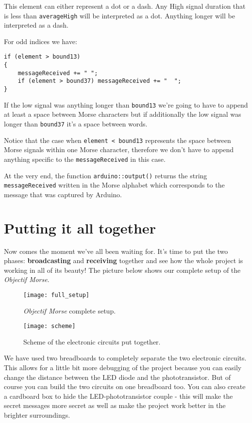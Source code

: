 \documentclass[12pt]{report}
\begin{document}
This element can either represent a dot or a dash. Any High signal duration that is less than \texttt{averageHigh} will be interpreted as a dot. Anything longer will be interpreted as a dash.

\newpage

For odd indices we have:

\begin{lstlisting}
if (element > bound13)
{
	messageReceived += " ";
	if (element > bound37) messageReceived += "  ";
}
\end{lstlisting}

If the low signal was anything longer than \texttt{bound13} we're going to have to append at least a space between Morse characters but if additionally the low signal was longer than \texttt{bound37} it's a space between words.

Notice that the case when \texttt{element < bound13} represents the space between Morse signals within one Morse character, therefore we don't have to append anything specific to the \texttt{messageReceived} in this case.

At the very end, the function \texttt{arduino::output()} returns the string \texttt{messageReceived} written in the Morse alphabet which corresponds to the message that was captured by Arduino.

\chapter{Putting it all together}

Now comes the moment we've all been waiting for. It's time to put the two phases: \textbf{broadcasting} and \textbf{receiving} together and see how the whole project is working in all of its beauty! The picture below shows our complete setup of the \textit{Objectif Morse}.

\begin{figure}[H]
\centering\texttt{[image: full\_setup]}
\caption{\textit{Objectif Morse} complete setup.}				
\label{fig:full_setup}
\end{figure}

\begin{figure}[H]
\centering\texttt{[image: scheme]}
\caption{Scheme of the electronic circuits put together.}				
\label{fig:circuits}
\end{figure}

We have used two breadboards to completely separate the two electronic circuits. This allows for a little bit more debugging of the project because you can easily change the distance between the LED diode and the phototransistor. But of course you can build the two circuits on one breadboard too. You can also create a cardboard box to hide the LED-phototransistor couple - this will make the secret messages more secret as well as make the project work better in the brighter surroundings.
\end{document}
